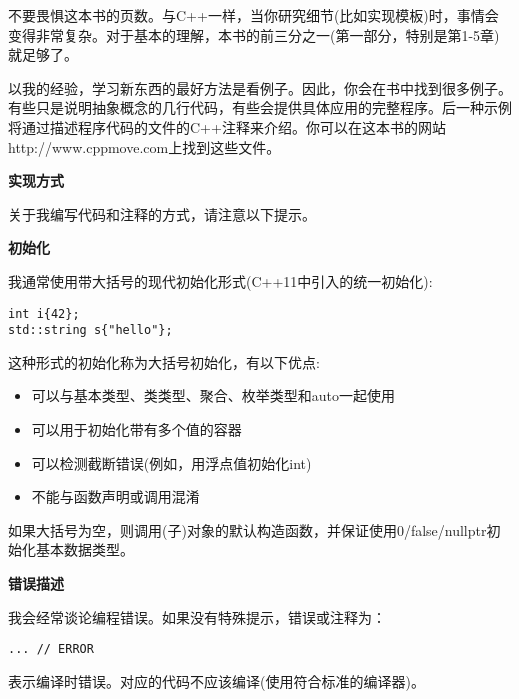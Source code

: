 不要畏惧这本书的页数。与C++一样，当你研究细节(比如实现模板)时，事情会变得非常复杂。对于基本的理解，本书的前三分之一(第一部分，特别是第1-5章)就足够了。\par

以我的经验，学习新东西的最好方法是看例子。因此，你会在书中找到很多例子。有些只是说明抽象概念的几行代码，有些会提供具体应用的完整程序。后一种示例将通过描述程序代码的文件的C++注释来介绍。你可以在这本书的网站http://www.cppmove.com上找到这些文件。\par

\hspace*{\fill} \par %
\textbf{实现方式}

关于我编写代码和注释的方式，请注意以下提示。\par

\hspace*{\fill} \par %
\textbf{初始化}

我通常使用带大括号的现代初始化形式(C++11中引入的统一初始化):\par
\begin{lstlisting}[caption={}]
int i{42};
std::string s{"hello"};
\end{lstlisting}

这种形式的初始化称为大括号初始化，有以下优点:\par
\begin{itemize}
	\item 可以与基本类型、类类型、聚合、枚举类型和auto一起使用
	\item 可以用于初始化带有多个值的容器
	\item 可以检测截断错误(例如，用浮点值初始化int)
	\item 不能与函数声明或调用混淆
\end{itemize}

如果大括号为空，则调用(子)对象的默认构造函数，并保证使用0/false/nullptr初始化基本数据类型。\par

\hspace*{\fill} \par %
\textbf{错误描述}

我会经常谈论编程错误。如果没有特殊提示，错误或注释为：\par
\begin{lstlisting}[caption={}]
... // ERROR
\end{lstlisting}
表示编译时错误。对应的代码不应该编译(使用符合标准的编译器)。\par

